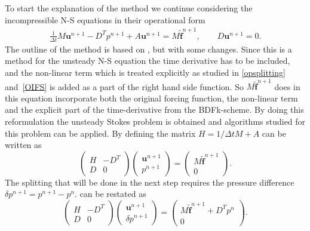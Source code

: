 To start the explanation of the method we continue considering the incompressible N-S equations in their 
operational form 
\begin{align}
    \frac{1}{\Delta t} M \mathbf{u}^{n+1}-D^Tp^{n+1}+A \mathbf{u}^{n+1} = M\mathbf{\tilde f}^{n+1},
    \qquad D\mathbf{u}^{n+1}    = 0.
    \label{eq:DiscreteStart}
\end{align}
The outline of the method is based on , but with some changes. Since this 
is a method for the unsteady N-S equation the time derivative has to be included, and the 
non-linear term which is treated explicitly as studied in \cref{opsplitting} and~\ref{OIFS}
is added as a part of the right hand side function. So $M\mathbf{\tilde f}^{n+1}$ does in this equation 
incorporate both the original forcing function, the non-linear term and the explicit part of the 
time-derivative from the BDFk-scheme. 
By doing this reformulation the unsteady Stokes problem is obtained and algorithms studied 
for this problem can be applied.
By defining the matrix $H = 1/\Delta t M + A$  
can be written as 
\begin{equation}
\begin{pmatrix}
    H & -D^T \\ 
    D & 0
\end{pmatrix}
\begin{pmatrix}
    \mathbf{u}^{n+1}  \\ 
    p^{n+1} 
\end{pmatrix}
=
\begin{pmatrix}
    M\mathbf{\tilde f}^{n+1}  \\ 
    0 
    \end{pmatrix}.
    \label{eq:Matform}
\end{equation}
The splitting that will be done in the next step requires the 
pressure difference $\delta p^{n+1} = p^{n+1}-p^n$.  can be restated as 
\begin{equation}
\begin{pmatrix}
    H & -D^T \\ 
    D & 0
\end{pmatrix}
\begin{pmatrix}
    \mathbf{u}^{n+1}  \\ 
    \delta p^{n+1} 
\end{pmatrix}
=
\begin{pmatrix}
    M\mathbf{\tilde f}^{n+1} +D^Tp^n  \\ 
    0 
    \end{pmatrix}.
    \label{eq:Matform}
\end{equation}


